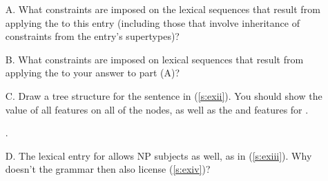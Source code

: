 \documentclass[a4paper,landscape,headrule,footrule]{foils}
\begin{document}
\newpage
\begin{itemize}
\item[A.] What constraints are imposed on the lexical sequences that
  result from applying the  to
  this entry (including those that involve inheritance of constraints
  from the entry's supertypes)?

\item[B.] What constraints are imposed on lexical sequences that
  result from applying the  to your
  answer to part (A)?

\item[C.] Draw a tree structure for the sentence in (\ref{s:exii}).
  You should show the value of all  features on all of the nodes,
  as well as the  and  features for .

\begin{exe}
  \ex\label{s:exii} .
\end{exe}
\newpage
\item[D.] The lexical entry for  allows NP subjects as
  well, as in (\ref{s:exiii}).  Why doesn't the grammar then also
  license (\ref{s:exiv})?

\begin{exe}
\ex\label{s:exiii} 

\ex\label{s:exiv} \bad {}
\end{exe}
\end{itemize}
\end{document}
